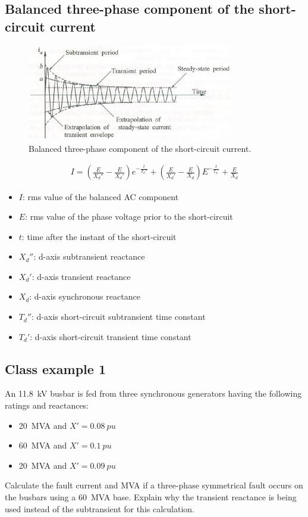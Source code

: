 \subsection{Balanced three-phase component of the short-circuit current}
\begin{figure}[H]
    \centering
    \includegraphics[width = 0.8\textwidth]{img/figure90.png}
    \caption{Balanced three-phase component of the short-circuit current.}
\end{figure}
\begin{gather}
    I = \left(\frac{E}{X_d''}-\frac{E}{X_d'}\right)e^{-\frac{t}{T_d''}} + \left(\frac{E}{X_d'}-\frac{E}{X_d}\right)E^{-\frac{t}{T_d'}}+\frac{E}{X_d}
\end{gather}
\begin{itemize}
    \item $I$: rms value of the balanced AC component
    \item $E$: rms value of the phase voltage prior to the short-circuit
    \item $t$: time after the instant of the short-circuit
    \item $X_d''$: d-axis subtransient reactance
    \item $X_d'$: d-axis transient reactance
    \item $X_d$: d-axis synchronous reactance
    \item $T_d''$: d-axis short-circuit subtransient time constant
    \item $T_d'$: d-axis short-circuit transient time constant
\end{itemize}
\subsection{Class example 1}
An \SI{11.8}{\kilo\volt} busbar is fed from three synchronous generators having the following ratings and reactances:
\begin{itemize}
    \item \SI{20}{MVA} and $X' = \SI{0.08}{pu}$
    \item \SI{60}{MVA} and $X' = \SI{0.1}{pu}$
    \item \SI{20}{MVA} and $X' = \SI{0.09}{pu}$
\end{itemize}
Calculate the fault current and MVA if a three-phase symmetrical fault occurs on the busbars using a \SI{60}{MVA} base. Explain why the transient reactance is being used instead of the subtransient for this calculation.

